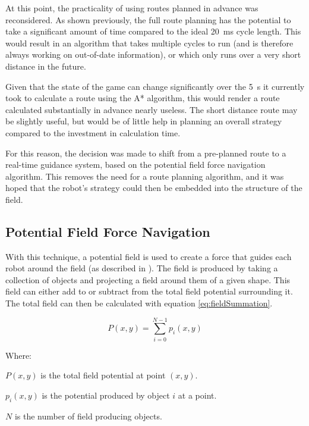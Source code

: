 \documentclass[10pt]{article}
\begin{document}
At this point, the practicality of using routes planned in advance was
reconsidered.  As shown previously, the full route planning has the potential to
take a significant amount of time compared to the ideal \SI{20}{\milli\second}
cycle length.  This would result in an algorithm that takes multiple cycles to
run (and is therefore always working on out-of-date information), or which only
runs over a very short distance in the future.

Given that the state of the game can change significantly over the
\SI{5}{\second} it currently took to calculate a route using the A* algorithm,
this would render a route calculated substantially in advance nearly useless. 
The short distance route may be slightly useful, but would be of little help in
planning an overall strategy compared to the investment in calculation time.

For this reason, the decision was made to shift from a pre-planned route to a
real-time guidance system, based on the potential field force navigation
algorithm. This removes the need for a route planning algorithm, and it was
hoped that the robot's strategy could then be embedded into the structure of the
field.

\subsection{Potential Field Force Navigation\label{sub:Potential-Field-Force}}

With this technique, a potential field is used to create a force that guides
each robot around the field (as described in
\cite{intelligentAlgorithmPathPlanning}). The field is produced by taking a
collection of objects and projecting a field around them of a given shape. This
field can either add to or subtract from the total field potential surrounding
it. The total field can then be calculated with equation
\ref{eq:fieldSummation}.

\begin{equation}
P(x,y)=\sum_{i=0}^{N-1}p_{i}\left(x,y\right)\label{eq:fieldSummation}
\end{equation}

Where:

$P\left(x,y\right)$ is the total field potential at point $\left(x,y\right)$.

$p_{i}\left(x,y\right)$ is the potential produced by object $i$ at a point.

$N$ is the number of field producing objects.
\end{document}
